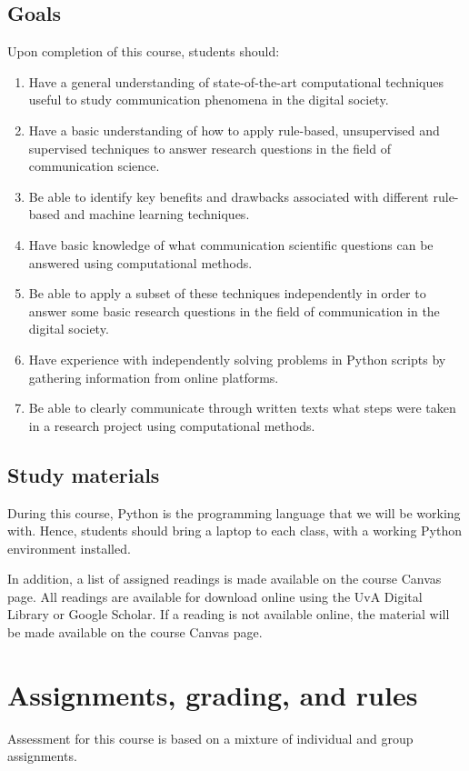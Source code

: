 \documentclass[a4paper,10pt,twocolumn]{report}
\begin{document}
	\section{Goals}
	Upon completion of this course, students should:
	\begin{enumerate}[a]
		\item Have a general understanding of state-of-the-art computational techniques useful to study communication phenomena in the digital society.
		\item Have a basic understanding of how to apply rule-based, unsupervised and supervised techniques to answer research questions in the field of communication science.
		\item Be able to identify key benefits and drawbacks associated with different rule-based and machine learning techniques.
		\item Have basic knowledge of what communication scientific questions can be answered using computational methods.
		\item Be able to apply a subset of these techniques independently in order to answer some basic research questions in the field of communication in the digital society.
		\item Have experience with independently solving problems in Python scripts by gathering information from online platforms.
		\item Be able to clearly communicate through written texts what steps were taken in a research project using computational methods.
	\end{enumerate}

	\section{Study materials}
	During this course, Python is the programming language that we will be working with. Hence, students should bring a laptop to each class, with a working Python environment installed.  
	
	In addition, a list of assigned readings is made available on the course Canvas page. All readings are available for download online using the UvA Digital Library or Google Scholar. If a reading is not available online, the material will be made available on the course Canvas page.
	
	
\chapter{Assignments, grading, and rules}
Assessment for this course is based on a mixture of individual and group assignments. 
	
\end{document}
